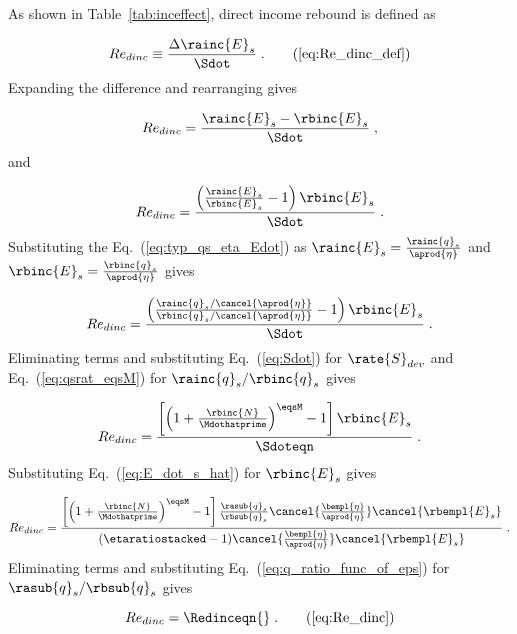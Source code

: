 As shown in Table~\ref{tab:inceffect}, direct income rebound is defined as

\begin{equation}
  Re_{dinc} \equiv \frac{\Delta \rainc{E}_s}{\Sdot} \; . \tag{\ref{eq:Re_dinc_def}}
\end{equation}
%
Expanding the difference and rearranging gives

\begin{equation}
  Re_{dinc} = \frac{\rainc{E}_s - \rbinc{E}_s}{\Sdot} \; , 
\end{equation}
%
and

\begin{equation}
  Re_{dinc} = \frac{\left( \frac{\rainc{E}_s}{\rbinc{E}_s} - 1  \right) \rbinc{E}_s}{\Sdot} \; .
\end{equation}
%
Substituting the Eq.~(\ref{eq:typ_qs_eta_Edot}) as
$\rainc{E}_s = \frac{\rainc{q}_s}{\aprod{\eta}}$ and  
$\rbinc{E}_s = \frac{\rbinc{q}_s}{\aprod{\eta}}$ gives

\begin{equation}
  Re_{dinc} = \frac{\left( \frac{\rainc{q}_s / \cancel{\aprod{\eta}}}{\rbinc{q}_s / \cancel{\aprod{\eta}}} - 1  \right) \rbinc{E}_s} 
              {\Sdot} \; .
\end{equation}
%
Eliminating terms and substituting Eq.~(\ref{eq:Sdot}) for $\rate{S}_{dev}$ and
Eq.~(\ref{eq:qsrat_eqsM}) for $\rainc{q}_s / \rbinc{q}_s$ gives

\begin{equation}
  Re_{dinc} = \frac{\left[ \left( 1 + \frac{\rbinc{N}}{\Mdothatprime} \right) ^{\eqsM} - 1  \right] \rbinc{E}_s} 
              {\Sdoteqn} \; .
\end{equation}
%
Substituting Eq.~(\ref{eq:E_dot_s_hat}) for $\rbinc{E}_s$ gives

\begin{equation}
  Re_{dinc} = \frac{\left[ \left( 1 + \frac{\rbinc{N}}{\Mdothatprime} \right) ^{\eqsM} - 1  \right] 
                  \frac{\rasub{q}_s}{\rbsub{q}_s}
                \cancel{\frac{\bempl{\eta}}{\aprod{\eta}}}
                \cancel{\rbempl{E}_s}}
              {\left( \etaratiostacked - 1 \right)\! 
                  \cancel{\frac{\bempl{\eta}}{\aprod{\eta}}} \cancel{\rbempl{E}_s}} \; .
\end{equation}
%
Eliminating terms and substituting
Eq.~(\ref{eq:q_ratio_func_of_eps}) for $\rasub{q}_s / \rbsub{q}_s$ gives

\begin{equation} 
  Re_{dinc} = \Redinceqn{} \; . \tag{\ref{eq:Re_dinc}}
\end{equation}

